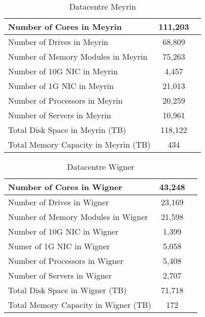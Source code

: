 \begin{table}[H]
    \begin{center}
    \begin{tabular}{|l|c|c}
        \hline
        Number of Cores in Meyrin & 111,203\\
        \hline
        Number of Drives in Meyrin & 68,809\\
        \hline
        Number of Memory Modules in Meyrin & 75,263\\
        \hline
        Number of 10G NIC in Meyrin & 4,457\\
        \hline
        Number of 1G NIC in Meyrin & 21,013\\
        \hline
        Number of Processors in Meyrin & 20,259\\
        \hline
        Number of Servers in Meyrin & 10,961\\
        \hline
        Total Disk Space in Meyrin (TB) & 118,122\\
        \hline
        Total Memory Capacity in Meyrin (TB) & 434\\
        \hline
    \end{tabular}
    \caption[]{Datacentre Meyrin}
    \vspace{2em}
    \end{center}
\end{table}
\begin{table}[H]
    \begin{center}
    \begin{tabular}{|l|c|c}
        \hline
        Number of Cores in Wigner & 43,248\\
        \hline
        Number of Drives in Wigner & 23,169\\
        \hline
        Number of Memory Modules in Wigner & 21,598\\
        \hline
        Number of 10G NIC in Wigner & 1,399\\
        \hline
        Numer of 1G NIC in Wigner & 5,058\\
        \hline
        Number of Processors in Wigner & 5,408\\
        \hline
        Number of Servers in Wigner & 2,707\\
        \hline
        Total Disk Space in Wigner (TB) & 71,718\\
        \hline
        Total Memory Capacity in Wigner (TB) & 172\\
        \hline
    \end{tabular}
    \caption[]{Datacentre Wigner}
    \vspace{2em}
    \end{center}
\end{table}
